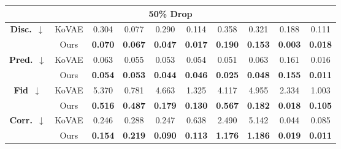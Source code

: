 \documentclass{article}
\theoremstyle{plain}
\theoremstyle{definition}
\theoremstyle{remark}
\begin{document}
{\begin{table*}[!t]
{\begin{tabular}{cc|cccccccc}
    \multicolumn{10}{c}{\textbf{50\% Drop}} \\
    \midrule
    \multirow{2}{*}{\textbf{Disc.}~$\downarrow$}
      & KoVAE  & 0.304 & 0.077 & 0.290 & 0.114 & 0.358 & 0.321 & 0.188 & 0.111 \\
      & Ours   & \cellcolor{blue!10}\textbf{0.070}
               & \cellcolor{blue!10}\textbf{0.067}
               & \cellcolor{blue!10}\textbf{0.047}
               & \cellcolor{blue!10}\textbf{0.017}
               & \cellcolor{blue!10}\textbf{0.190}
               & \cellcolor{blue!10}\textbf{0.153}
               & \cellcolor{blue!10}\textbf{0.003}
               & \cellcolor{blue!10}\textbf{0.018} \\
    \midrule
    \multirow{2}{*}{\textbf{Pred.}~$\downarrow$} 
      & KoVAE  & 0.063 & 0.055 & 0.053 & 0.054 & 0.051 & 0.063 & 0.161 & 0.016 \\
      & Ours   & \cellcolor{blue!10}\textbf{0.054}
               & \cellcolor{blue!10}\textbf{0.053}
               & \cellcolor{blue!10}\textbf{0.044}
               & \cellcolor{blue!10}\textbf{0.046}
               & \cellcolor{blue!10}\textbf{0.025}
               & \cellcolor{blue!10}\textbf{0.048}
               & \cellcolor{blue!10}\textbf{0.155}
               & \cellcolor{blue!10}\textbf{0.011} \\
    \midrule
    \multirow{2}{*}{\textbf{Fid}~$\downarrow$}     
      & KoVAE  & 5.370 & 0.781 & 4.663 & 1.325 & 4.117 & 4.955 & 2.334 & 1.003 \\
      & Ours   & \cellcolor{blue!10}\textbf{0.516}
               & \cellcolor{blue!10}\textbf{0.487}
               & \cellcolor{blue!10}\textbf{0.179}
               & \cellcolor{blue!10}\textbf{0.130}
               & \cellcolor{blue!10}\textbf{0.567}
               & \cellcolor{blue!10}\textbf{0.182}
               & \cellcolor{blue!10}\textbf{0.018}
               & \cellcolor{blue!10}\textbf{0.105} \\
    \midrule
    \multirow{2}{*}{\textbf{Corr.}~$\downarrow$}     
      & KoVAE  & 0.246 & 0.288 & 0.247 & 0.638 & 2.490 & 5.142 & 0.044 & 0.085 \\
      & Ours   & \cellcolor{blue!10}\textbf{0.154}
               & \cellcolor{blue!10}\textbf{0.219}
               & \cellcolor{blue!10}\textbf{0.090}
               & \cellcolor{blue!10}\textbf{0.113}
               & \cellcolor{blue!10}\textbf{1.176}
               & \cellcolor{blue!10}\textbf{1.186}
               & \cellcolor{blue!10}\textbf{0.019}
               & \cellcolor{blue!10}\textbf{0.011} \\
    \midrule


\end{tabular}}
\end{table*}}
\end{document}
